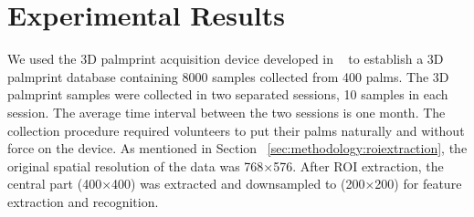 \chapter{Experimental Results\label{ch:experiment}}

We used the 3D palmprint acquisition device developed in ~\cite{Zhang:2009dp} to establish a 3D palmprint database containing 8000 samples collected from 400 palms. The 3D palmprint samples were collected in two separated sessions, 10 samples in each session. The average time interval between the two sessions is one month. The collection procedure required volunteers to put their palms naturally and without force on the device. As mentioned in Section ~\ref{sec:methodology:roiextraction}, the original spatial resolution of the data was 768×576. After ROI extraction, the central part (400×400) was extracted and downsampled to (200×200) for feature extraction and recognition.



